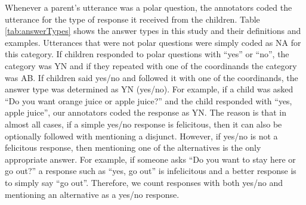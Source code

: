 \documentclass[oneside]{report}
\theoremstyle{definition}
\theoremstyle{definition}
\theoremstyle{definition}
\theoremstyle{remark}
\begin{document}
Whenever a parent's utterance was a polar question, the annotators coded
the utterance for the type of response it received from the children.
Table \ref{tab:answerTypes} shows the answer types in this study and
their definitions and examples. Utterances that were not polar questions
were simply coded as NA for this category. If children responded to
polar questions with ``yes'' or ``no'', the category was YN and if they
repeated with one of the coordinands the category was AB. If children
said yes/no and followed it with one of the coordinands, the answer type
was determined as YN (yes/no). For example, if a child was asked ``Do
you want orange juice or apple juice?'' and the child responded with
``yes, apple juice'', our annotators coded the response as YN. The
reason is that in almost all cases, if a simple yes/no response is
felicitous, then it can also be optionally followed with mentioning a
disjunct. However, if yes/no is not a felicitous response, then
mentioning one of the alternatives is the only appropriate answer. For
example, if someone asks ``Do you want to stay here or go out?'' a
response such as ``yes, go out'' is infelicitous and a better response
is to simply say ``go out''. Therefore, we count responses with both
yes/no and mentioning an alternative as a yes/no response.
\end{document}
